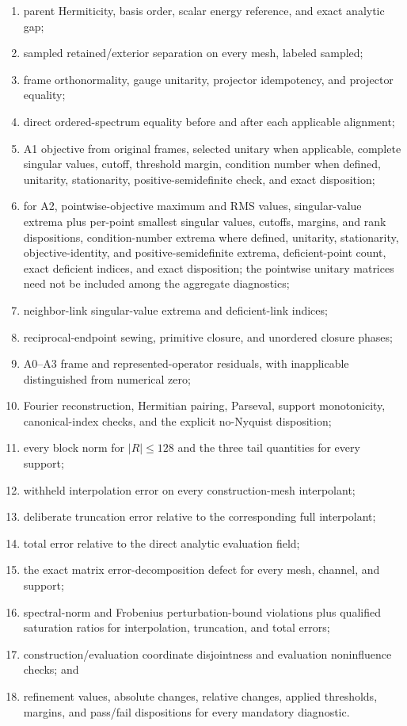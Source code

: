 \documentclass[11pt]{article}
\begin{document}
\begin{enumerate}
\item parent Hermiticity, basis order, scalar energy reference, and exact analytic gap;
\item sampled retained/exterior separation on every mesh, labeled sampled;
\item frame orthonormality, gauge unitarity, projector idempotency, and projector equality;
\item direct ordered-spectrum equality before and after each applicable alignment;
\item A1 objective from original frames, selected unitary when applicable, complete
singular values, cutoff, threshold margin, condition number when defined, unitarity,
stationarity, positive-semidefinite check, and exact disposition;
\item for A2, pointwise-objective maximum and RMS values, singular-value extrema plus
per-point smallest singular values, cutoffs, margins, and rank dispositions,
condition-number extrema where defined, unitarity, stationarity, objective-identity, and
positive-semidefinite extrema, deficient-point count, exact deficient indices, and exact
disposition; the pointwise unitary matrices need not be included among the aggregate
diagnostics;
\item neighbor-link singular-value extrema and deficient-link indices;
\item reciprocal-endpoint sewing, primitive closure, and unordered closure phases;
\item A0--A3 frame and represented-operator residuals, with inapplicable distinguished from
numerical zero;
\item Fourier reconstruction, Hermitian pairing, Parseval, support monotonicity,
canonical-index checks, and the explicit no-Nyquist disposition;
\item every block norm for $|R|\leq128$ and the three tail quantities for every support;
\item withheld interpolation error on every construction-mesh interpolant;
\item deliberate truncation error relative to the corresponding full interpolant;
\item total error relative to the direct analytic evaluation field;
\item the exact matrix error-decomposition defect for every mesh, channel, and support;
\item spectral-norm and Frobenius perturbation-bound violations plus qualified saturation
ratios for interpolation, truncation, and total errors;
\item construction/evaluation coordinate disjointness and evaluation noninfluence checks;
and
\item refinement values, absolute changes, relative changes, applied thresholds, margins,
and pass/fail dispositions for every mandatory diagnostic.
\end{enumerate}
\end{document}
